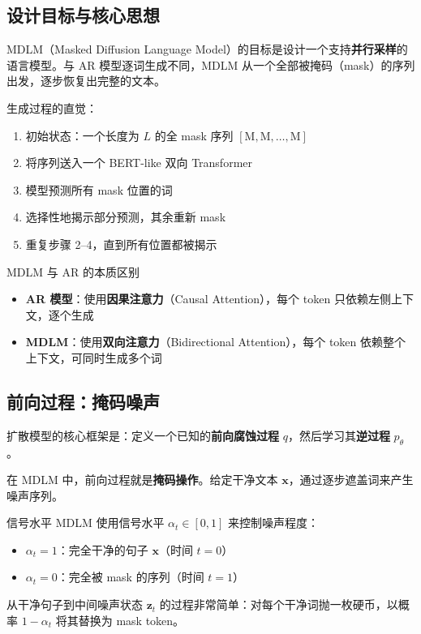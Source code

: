 \documentclass[a4paper]{article}
\begin{document}
\subsection{设计目标与核心思想}

MDLM（Masked Diffusion Language Model）的目标是设计一个支持\textbf{并行采样}的语言模型。与 AR 模型逐词生成不同，MDLM 从一个全部被掩码（mask）的序列出发，逐步恢复出完整的文本。

生成过程的直觉：
\begin{enumerate}
    \item 初始状态：一个长度为 $L$ 的全 mask 序列 $[\text{M}, \text{M}, \ldots, \text{M}]$
    \item 将序列送入一个 BERT-like 双向 Transformer
    \item 模型预测所有 mask 位置的词
    \item 选择性地揭示部分预测，其余重新 mask
    \item 重复步骤 2--4，直到所有位置都被揭示
\end{enumerate}

\begin{importantbox}{MDLM 与 AR 的本质区别}
\begin{itemize}
    \item \textbf{AR 模型}：使用\textbf{因果注意力}（Causal Attention），每个 token 只依赖左侧上下文，逐个生成
    \item \textbf{MDLM}：使用\textbf{双向注意力}（Bidirectional Attention），每个 token 依赖整个上下文，可同时生成多个词
\end{itemize}
\end{importantbox}

\subsection{前向过程：掩码噪声}

扩散模型的核心框架是：定义一个已知的\textbf{前向腐蚀过程} $q$，然后学习其\textbf{逆过程} $p_\theta$。

在 MDLM 中，前向过程就是\textbf{掩码操作}。给定干净文本 $\mathbf{x}$，通过逐步遮盖词来产生噪声序列。

\begin{importantbox}{信号水平}
MDLM 使用信号水平 $\alpha_t \in [0, 1]$ 来控制噪声程度：
\begin{itemize}
    \item $\alpha_t = 1$：完全干净的句子 $\mathbf{x}$（时间 $t = 0$）
    \item $\alpha_t = 0$：完全被 mask 的序列（时间 $t = 1$）
\end{itemize}
从干净句子到中间噪声状态 $\mathbf{z}_t$ 的过程非常简单：对每个干净词抛一枚硬币，以概率 $1 - \alpha_t$ 将其替换为 mask token。
\end{importantbox}
\end{document}
